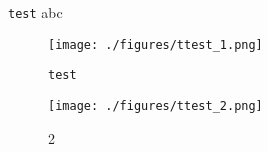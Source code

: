 \lstinline/test/
abc
\begin{figure}[ht]
\centering
\texttt{[image: ./figures/ttest\_1.png]}
\caption{\lstinline /test/} \label{ttest_fig1}
\end{figure}

\begin{figure}[ht]
\centering
\texttt{[image: ./figures/ttest\_2.png]}
\caption{2} \label{ttest_fig2}
\end{figure}